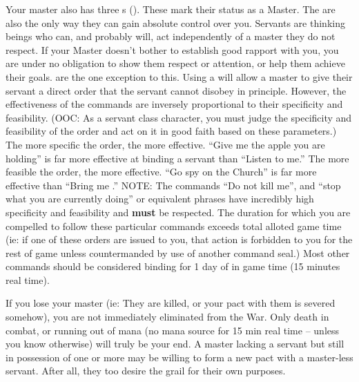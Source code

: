 \documentclass[blue]{FateDarkDawn}
\begin{document}
Your master also has three \iCommand{\MYname}s (\iCommand{\MYnumber}). These mark their status as a Master. The \iCommand{\MYname} are also the only way they can gain absolute control over you. Servants are thinking beings who can, and probably will, act independently of a master they do not respect. If your Master doesn't bother to establish good rapport with you, you are under no obligation to show them respect or attention, or help them achieve their goals. \iCommand{\MYname} are the one exception to this. Using a \iCommand{\MYname} will allow a master to give their servant a direct order that the servant cannot disobey in principle. However, the effectiveness of the commands are inversely proportional to their specificity and feasibility. (OOC: As a servant class character, you must judge the specificity and feasibility of the order and act on it in good faith based on these parameters.) The more specific the order, the more effective. ``Give me the apple you are holding'' is far more effective at binding a servant than ``Listen to me.'' The more feasible the order, the more effective. ``Go spy on the Church'' is far more effective than ``Bring me \iGrail{\MYname}.'' NOTE: The commands ``Do not kill me'', and ``stop what you are currently doing'' or equivalent phrases have incredibly high specificity and feasibility and {\bf must} be respected. The duration for which you are compelled to follow these particular commands exceeds total alloted game time (ie: if one of these orders are issued to you, that action is forbidden to you for the rest of game unless countermanded by use of another command seal.) Most other commands should be considered binding for 1 day of in game time (15 minutes real time).

If you lose your master (ie: They are killed, or your pact with them is severed somehow), you are not immediately eliminated from the War. Only death in combat, or running out of mana (no mana source for 15 min real time -- unless you know otherwise) will truly be your end.  A master lacking a servant but still in possession of one or more \iCommand{\MYname} may be willing to form a new pact with a master-less servant. After all, they too desire the grail for their own purposes.
\end{document}
